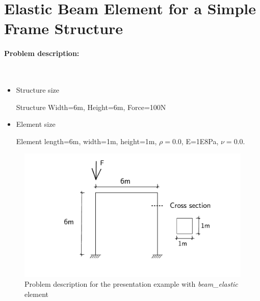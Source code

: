 \documentclass[fleqn,11pt]{article}
\begin{document}

\thispagestyle{fancy}


\tableofcontents{}








\newpage
\section{Elastic Beam Element for a Simple Frame Structure}

\paragraph{Problem description:} ~

\begin{itemize}
  \item Structure size

    Structure Width=6m, Height=6m, Force=100N 

  \item Element size

    Element length=6m, width=1m, height=1m, $\rho=0.0$, E=1E8Pa, $\nu=0.0$.
\end{itemize}


\begin{figure}[H]
  \centering
  \includegraphics[width=12cm]{../Figure-files/beam_elastic_frame_descrip.pdf}
  \caption{Problem description for the presentation example with \emph{beam\_elastic} element}
  \label{fig Problem description for the presentation example with beam element}
\end{figure}
\end{document}
